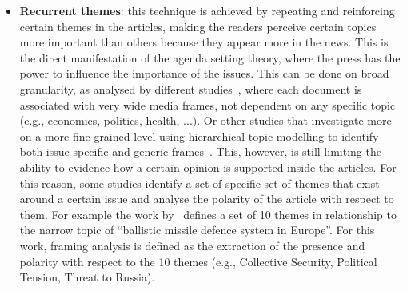 \begin{itemize}
    \item \textbf{Recurrent themes}: this technique is achieved by repeating and reinforcing certain themes in the articles, making the readers perceive certain topics more important than others because they appear more in the news. This is the direct manifestation of the agenda setting theory, where the press has the power to influence the importance of the issues.
    This can be done on broad granularity, as analysed by different studies~\cite{tsur2015frame,card2015media}, where each document is associated with very wide media frames, not dependent on any specific topic (e.g., economics, politics, health, ...).
    Or other studies that investigate more on a more fine-grained level using hierarchical topic modelling to identify both issue-specific and generic frames~\cite{boydstun2013making}.
    This, however, is still limiting the ability to evidence how a certain opinion is supported inside the articles. For this reason, some studies identify a set of specific set of themes that exist around a certain issue and analyse the polarity of the article with respect to them. For example the work by~\citet{morstatter2018identifying} defines a set of 10 themes in relationship to the narrow topic of ``ballistic missile defence system in Europe''. For this work, framing analysis is defined as the extraction of the presence and polarity with respect to the 10 themes (e.g., Collective Security, Political Tension, Threat to Russia).
    
    

\end{itemize}
